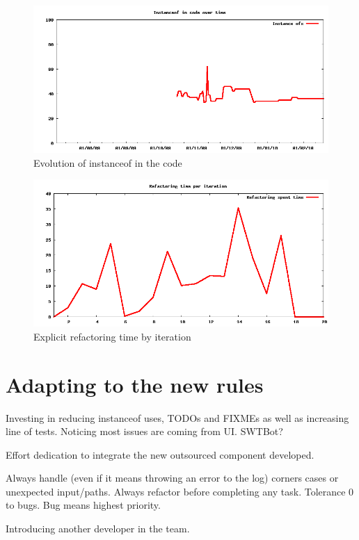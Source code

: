 \documentclass[lnbip]{svmultln}
\begin{document}
\begin{figure}[hbt]
  \centerline{
    \includegraphics[width=120mm]{InstanceOfs.png}
  }
  \caption{Evolution of instanceof in the code }
  \label{fig:InstanceOfs}
\end{figure}

\begin{figure}[hbt]
  \centerline{
    \includegraphics[width=120mm]{refactoring.png}
  }
  \caption{Explicit refactoring time by iteration}
  \label{fig:refactoring}
\end{figure}

\section{Adapting to the new rules}
\label{sec:adapting}

Investing in reducing instanceof uses, TODOs and FIXMEs as well as
increasing line of tests. Noticing most issues are coming from
UI. SWTBot?

Effort dedication to integrate the new outsourced component developed.

Always handle (even if it means throwing an error to the log) corners
cases or unexpected input/paths. Always refactor before completing any
task. Tolerance 0 to bugs. Bug means highest priority.

Introducing another developer in the team.
\end{document}
